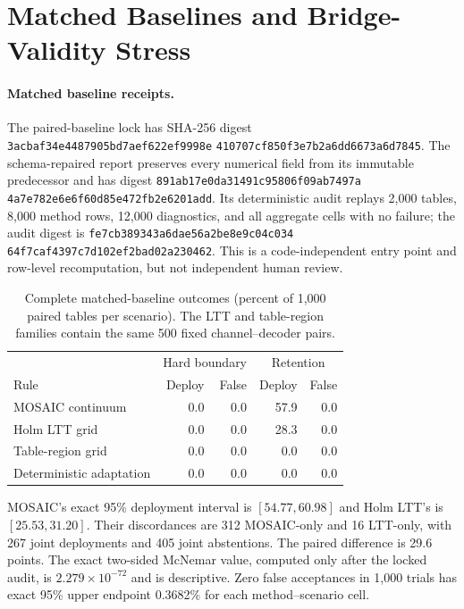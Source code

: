 \section{Matched Baselines and Bridge-Validity Stress}

\begingroup\raggedright
\paragraph{Matched baseline receipts.}
The paired-baseline lock has SHA-256 digest
\texttt{3acbaf34e4487905bd7aef622ef9998e}\allowbreak
\texttt{410707cf850f3e7b2a6dd6673a6d7845}. The schema-repaired report preserves
every numerical field from its immutable predecessor and has digest
\texttt{891ab17e0da31491c95806f09ab7497a}\allowbreak
\texttt{4a7e782e6e6f60d85e472fb2e6201add}. Its deterministic audit replays 2,000
tables, 8,000 method rows, 12,000 diagnostics, and all aggregate cells with no
failure; the audit digest is
\texttt{fe7cb389343a6dae56a2be8e9c04c034}\allowbreak
\texttt{64f7caf4397c7d102ef2bad02a230462}. This is a code-independent entry point
and row-level recomputation, but not independent human review.\par
\endgroup

\begin{table}[t]
\centering
\small
\setlength{\tabcolsep}{3.0pt}
\begin{tabular}{lrrrr}
\hline
& \multicolumn{2}{c}{Hard boundary} & \multicolumn{2}{c}{Retention} \\
Rule & Deploy & False & Deploy & False \\
\hline
MOSAIC continuum & 0.0 & 0.0 & 57.9 & 0.0 \\
Holm LTT grid & 0.0 & 0.0 & 28.3 & 0.0 \\
Table-region grid & 0.0 & 0.0 & 0.0 & 0.0 \\
Deterministic adaptation & 0.0 & 0.0 & 0.0 & 0.0 \\
\hline
\end{tabular}
\caption{Complete matched-baseline outcomes (percent of 1,000 paired tables
per scenario). The LTT and table-region families contain the same 500 fixed
channel--decoder pairs.}
\label{supp:tab:matched-baselines}
\end{table}

MOSAIC's exact 95\% deployment interval is $[54.77,60.98]$ and Holm LTT's is
$[25.53,31.20]$. Their discordances are 312 MOSAIC-only and 16 LTT-only, with
267 joint deployments and 405 joint abstentions. The paired difference is
29.6 points. The exact two-sided McNemar value, computed only after the locked
audit, is $2.279\times10^{-72}$ and is descriptive. Zero false acceptances in
1,000 trials has exact 95\% upper endpoint 0.3682\% for each method--scenario
cell.


